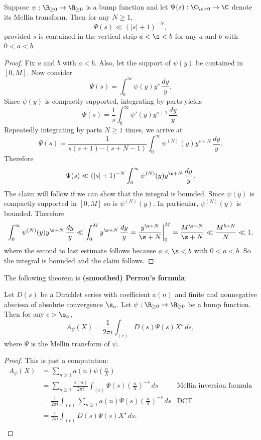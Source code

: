     \begin{proposition}\label{prop:smoothing_function_Mellin_inverse_vertical_strips}
      Suppose $\psi:\R_{\ge 0} \to \R_{\ge 0}$ is a bump function and let $\Psi(s):\C_{\s > 0} \to \C$ denote its Mellin transform. Then for any $N \ge 1$,
      \[
        \Psi(s) \ll (|s|+1)^{-N},
      \]
      provided $s$ is contained in the vertical strip $a < \s < b$ for any $a$ and $b$ with $0 < a < b$.
    \end{proposition}
    \begin{proof}
      Fix $a$ and $b$ with $a < b$. Also, let the support of $\psi(y)$ be contained in $[0,M]$. Now consider
      \[
        \Psi(s) = \int_{0}^{\infty}\psi(y)y^{s}\,\frac{dy}{y}.
      \]
      Since $\psi(y)$ is compactly supported, integrating by parts yields
      \[
        \Psi(s) = \frac{1}{s}\int_{0}^{\infty}\psi'(y)y^{s+1}\,\frac{dy}{y}.
      \]
      Repeatedly integrating by parts $N \ge 1$ times, we arrive at
      \[
        \Psi(s) = \frac{1}{s(s+1) \cdots (s+N-1)}\int_{0}^{\infty}\psi^{(N)}(y)y^{s+N}\,\frac{dy}{y}.
      \]
      Therefore
      \[
        \Psi(s) \ll (|s|+1)^{-N}\int_{0}^{\infty}\psi^{(N)}(y)y^{\s+N}\,\frac{dy}{y}.
      \]
      The claim will follow if we can show that the integral is bounded. Since $\psi(y)$ is compactly supported in $[0,M]$ so is $\psi^{(N)}(y)$. In particular, $\psi^{(N)}(y)$ is bounded. Therefore
      \[
        \int_{0}^{\infty}\psi^{(N)}(y)y^{\s+N}\,\frac{dy}{y} \ll \int_{0}^{M}y^{\s+N}\,\frac{dy}{y} = \frac{y^{\s+N}}{\s+N}\bigg|_{0}^{M} = \frac{M^{\s+N}}{\s+N} \ll \frac{M^{b+N}}{N} \ll 1,
      \]
      where the second to last estimate follows because $a < \s < b$ with $0 < a < b$. So the integral is bounded and the claim follows.
    \end{proof}
    
    The following theorem is \textbf{(smoothed) Perron's formula}:

    \begin{theorem}
      Let $D(s)$ be a Dirichlet series with coefficient $a(n)$ and finite and nonnegative abscissa of absolute convergence $\s_{a}$. Let $\psi:\R_{\ge 0} \to \R_{\ge 0}$ be a bump function. Then for any $c > \s_{a}$,
      \[
        A_{\psi}(X) = \frac{1}{2\pi i}\int_{(c)}D(s)\Psi(s)X^{s}\,ds,
      \]
      where $\Psi$ is the Mellin transform of $\psi$.
    \end{theorem}
    \begin{proof}
      This is just a computation:
      \begin{align*}
        A_{\psi}(X) &= \sum_{n \ge 1}a(n)\psi\left(\frac{n}{X}\right) \\
        &= \sum_{n \ge 1}\frac{a(n)}{2\pi i}\int_{(c)}\Psi(s)\left(\frac{n}{X}\right)^{-s}\,ds & \text{Mellin inversion formula} \\
        &= \frac{1}{2\pi i}\int_{(c)}\sum_{n \ge 1}a(n)\Psi(s)\left(\frac{n}{X}\right)^{-s}\,ds & \text{DCT} \\
        &= \frac{1}{2\pi i}\int_{(c)}D(s)\Psi(s)X^{s}\,ds. \\
      \end{align*}
    \end{proof}

